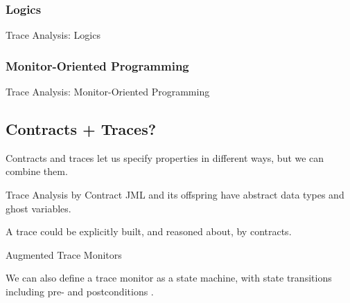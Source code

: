 \documentclass[12pt]{beamer}
\begin{document}
\subsubsection{Logics}
\label{sec:runver-trace-log}

\begin{frame}{Trace Analysis: Logics}

\end{frame}

\subsubsection{Monitor-Oriented Programming}
\label{sec:runver-trace-mop}

\begin{frame}{Trace Analysis: Monitor-Oriented Programming}

\end{frame}


\subsection{Contracts + Traces?}
\label{sec:runver-tbc}

\begin{frame}
  \begin{center}
    \Large Contracts and traces let us specify properties in different
    ways, but we can combine them.
  \end{center}
\end{frame}

\begin{frame}{Trace Analysis by Contract}
  JML and its offspring have abstract data types and ghost variables.

  \vspace{0.25cm}

  A trace could be explicitly built, and reasoned about, by contracts.
\end{frame}

\begin{frame}{Augmented Trace Monitors}

  We can also define a trace monitor as a state machine, with state
  transitions including pre- and postconditions \parencite{unified}.

  \begin{center}
  \end{center}
\end{frame}
\end{document}

